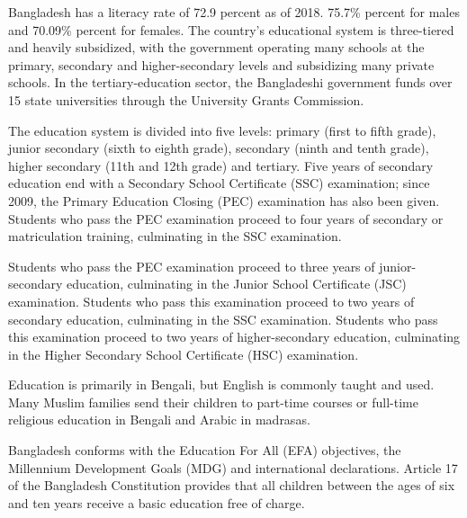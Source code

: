 Bangladesh has a literacy rate of 72.9 percent as of 2018. 75.7\%
percent for males and 70.09\% percent for females. The country's
educational system is three-tiered and heavily subsidized, with the
government operating many schools at the primary, secondary and
higher-secondary levels and subsidizing many private schools. In the
tertiary-education sector, the Bangladeshi government funds over 15
state universities through the University Grants Commission.

The education system is divided into five levels: primary (first to
fifth grade), junior secondary (sixth to eighth grade), secondary (ninth
and tenth grade), higher secondary (11th and 12th grade) and tertiary.
Five years of secondary education end with a Secondary School
Certificate (SSC) examination; since 2009, the Primary Education Closing
(PEC) examination has also been given. Students who pass the PEC
examination proceed to four years of secondary or matriculation
training, culminating in the SSC examination.

Students who pass the PEC examination proceed to three years of
junior-secondary education, culminating in the Junior School Certificate
(JSC) examination. Students who pass this examination proceed to two
years of secondary education, culminating in the SSC examination.
Students who pass this examination proceed to two years of
higher-secondary education, culminating in the Higher Secondary School
Certificate (HSC) examination.

Education is primarily in Bengali, but English is commonly taught and
used. Many Muslim families send their children to part-time courses or
full-time religious education in Bengali and Arabic in madrasas.

Bangladesh conforms with the Education For All (EFA) objectives, the
Millennium Development Goals (MDG) and international declarations.
Article 17 of the Bangladesh Constitution provides that all children
between the ages of six and ten years receive a basic education free of
charge.

